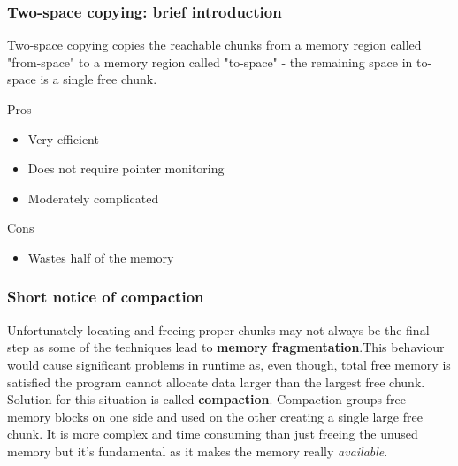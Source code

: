 \documentclass[presentation]{beamer}
\begin{document}
\begin{frame}
    \frametitle{Two-space copying: brief introduction}
    \justifying
    Two-space copying copies the reachable chunks from a memory region called "from-space" to a memory region called "to-space" -  the remaining space in to-space is a single free chunk. 
    
    \begin{exampleblock}{Pros}
        \begin{itemize}
            \item Very efficient
            \item Does not require pointer monitoring
            \item Moderately complicated
        \end{itemize}
    \end{exampleblock}
    
    \begin{alertblock}{Cons}
        \begin{itemize}
            \item Wastes half of the memory
        \end{itemize}
    \end{alertblock}
\end{frame}

\begin{frame}
    \frametitle{Short notice of compaction}
    \justifying
    Unfortunately locating and freeing proper chunks may not always be the final step as some of the techniques lead to \textbf{memory fragmentation}.This behaviour would cause significant problems in runtime as, even though, total free memory is satisfied the program cannot allocate data larger than the largest free chunk. Solution for this situation is called \textbf{compaction}. Compaction groups free memory blocks on one side and used on the other creating a single large free chunk. It is more complex and time consuming than just freeing the unused memory but it's fundamental as it makes the memory really \textit{available}.
\end{frame}
\end{document}
